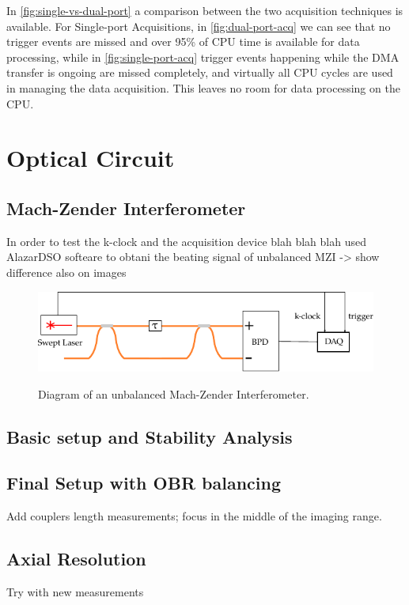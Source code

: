     In \autoref{fig:single-vs-dual-port} a comparison between the two acquisition techniques is available. For Single-port Acquisitions, in \autoref{fig:dual-port-acq} we can see that no trigger events are missed and over 95\% of CPU time is available for data processing, while in \autoref{fig:single-port-acq} trigger events happening while the DMA transfer is ongoing are missed completely, and virtually all CPU cycles are used in managing the data acquisition. This leaves no room for data processing on the CPU. 
    


\section{Optical Circuit}

\subsection{ Mach-Zender Interferometer }
In order to test the k-clock and the acquisition device blah blah blah used AlazarDSO softeare to obtani the beating signal of unbalanced MZI -> show difference also on images
\begin{figure}[bth]
	\myfloatalign
	{\includegraphics[width=\linewidth]{gfx/setup-diagrams/interferometer.pdf}}
	\caption{Diagram of an unbalanced Mach-Zender Interferometer.}\label{fig:unbalanced-mzi}
\end{figure}

\subsection{Basic setup and Stability Analysis}


\subsection{Final Setup with OBR balancing}
Add couplers length measurements;  focus in the middle of the imaging range. 

\subsection{Axial Resolution}
Try with new measurements


